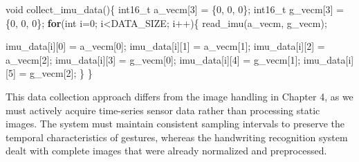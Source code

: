 \documentclass[
  9pt,
  letterpaper,
  abstract,
  titlepage]{scrbook}
\newenvironment{Shaded}{\begin{snugshade}}{\end{snugshade}}
\newcommand{\ControlFlowTok}[1]{\textcolor[rgb]{0.00,0.23,0.31}{\textbf{#1}}}
\newcommand{\DataTypeTok}[1]{\textcolor[rgb]{0.68,0.00,0.00}{#1}}
\newcommand{\DecValTok}[1]{\textcolor[rgb]{0.68,0.00,0.00}{#1}}
\newcommand{\NormalTok}[1]{\textcolor[rgb]{0.00,0.23,0.31}{#1}}
\newcommand{\OperatorTok}[1]{\textcolor[rgb]{0.37,0.37,0.37}{#1}}
\newcommand{\VariableTok}[1]{\textcolor[rgb]{0.07,0.07,0.07}{#1}}
\begin{document}
\begin{Shaded}
\begin{Highlighting}[]
\DataTypeTok{void}\NormalTok{ collect\_imu\_data}\OperatorTok{()\{}
  \DataTypeTok{int16\_t}\NormalTok{ a\_vecm}\OperatorTok{[}\DecValTok{3}\OperatorTok{]} \OperatorTok{=} \OperatorTok{\{}\DecValTok{0}\OperatorTok{,} \DecValTok{0}\OperatorTok{,} \DecValTok{0}\OperatorTok{\};}
  \DataTypeTok{int16\_t} \VariableTok{g\_vecm}\OperatorTok{[}\DecValTok{3}\OperatorTok{]} \OperatorTok{=} \OperatorTok{\{}\DecValTok{0}\OperatorTok{,} \DecValTok{0}\OperatorTok{,} \DecValTok{0}\OperatorTok{\};}
  \ControlFlowTok{for}\OperatorTok{(}\DataTypeTok{int}\NormalTok{ i}\OperatorTok{=}\DecValTok{0}\OperatorTok{;}\NormalTok{ i}\OperatorTok{\textless{}}\NormalTok{DATA\_SIZE}\OperatorTok{;}\NormalTok{ i}\OperatorTok{++)\{}
\NormalTok{      read\_imu}\OperatorTok{(}\NormalTok{a\_vecm}\OperatorTok{,} \VariableTok{g\_vecm}\OperatorTok{);}

\NormalTok{      imu\_data}\OperatorTok{[}\NormalTok{i}\OperatorTok{][}\DecValTok{0}\OperatorTok{]} \OperatorTok{=}\NormalTok{ a\_vecm}\OperatorTok{[}\DecValTok{0}\OperatorTok{];}
\NormalTok{      imu\_data}\OperatorTok{[}\NormalTok{i}\OperatorTok{][}\DecValTok{1}\OperatorTok{]} \OperatorTok{=}\NormalTok{ a\_vecm}\OperatorTok{[}\DecValTok{1}\OperatorTok{];}
\NormalTok{      imu\_data}\OperatorTok{[}\NormalTok{i}\OperatorTok{][}\DecValTok{2}\OperatorTok{]} \OperatorTok{=}\NormalTok{ a\_vecm}\OperatorTok{[}\DecValTok{2}\OperatorTok{];}
\NormalTok{      imu\_data}\OperatorTok{[}\NormalTok{i}\OperatorTok{][}\DecValTok{3}\OperatorTok{]} \OperatorTok{=} \VariableTok{g\_vecm}\OperatorTok{[}\DecValTok{0}\OperatorTok{];}
\NormalTok{      imu\_data}\OperatorTok{[}\NormalTok{i}\OperatorTok{][}\DecValTok{4}\OperatorTok{]} \OperatorTok{=} \VariableTok{g\_vecm}\OperatorTok{[}\DecValTok{1}\OperatorTok{];}
\NormalTok{      imu\_data}\OperatorTok{[}\NormalTok{i}\OperatorTok{][}\DecValTok{5}\OperatorTok{]} \OperatorTok{=} \VariableTok{g\_vecm}\OperatorTok{[}\DecValTok{2}\OperatorTok{];}
  \OperatorTok{\}}
\OperatorTok{\}}
\end{Highlighting}
\end{Shaded}

This data collection approach differs from the image handling in Chapter
4, as we must actively acquire time-series sensor data rather than
processing static images. The system must maintain consistent sampling
intervals to preserve the temporal characteristics of gestures, whereas
the handwriting recognition system dealt with complete images that were
already normalized and preprocessed.
\end{document}
